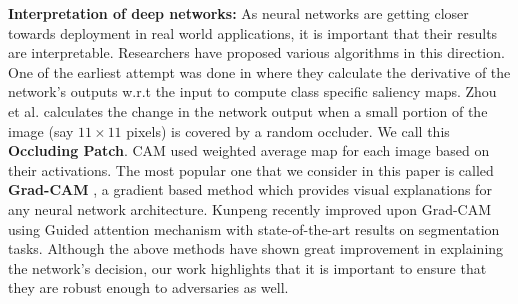 \documentclass[10pt,twocolumn,letterpaper]{article}
\begin{document}
{\bf Interpretation of deep networks:}
As neural networks are getting closer towards deployment in real world applications, it is important that their results are interpretable.
Researchers have proposed various algorithms in this direction. One of the earliest attempt was done in \cite{simonyan2013deep} where they calculate the derivative of the network's outputs w.r.t the input to compute class specific saliency maps. Zhou et al. \cite{zhou2014object} calculates the change in the network output when a small portion of the image (say $11\times11$ pixels) is covered by a random occluder. We call this \textbf{Occluding Patch}. CAM \cite{zhou2016learning} used weighted average map for each image based on their activations. The most popular one that we consider in this paper is called \textbf{Grad-CAM} \cite{selvaraju2016grad}, a gradient based method which provides visual explanations for any neural network architecture. Kunpeng \etal \cite{kunpeng2018gain} recently improved upon Grad-CAM using Guided attention mechanism with state-of-the-art results on segmentation tasks. Although the above methods have shown great improvement in explaining the network's decision, our work highlights that it is important to ensure that they are robust enough to adversaries as well.
\end{document}
